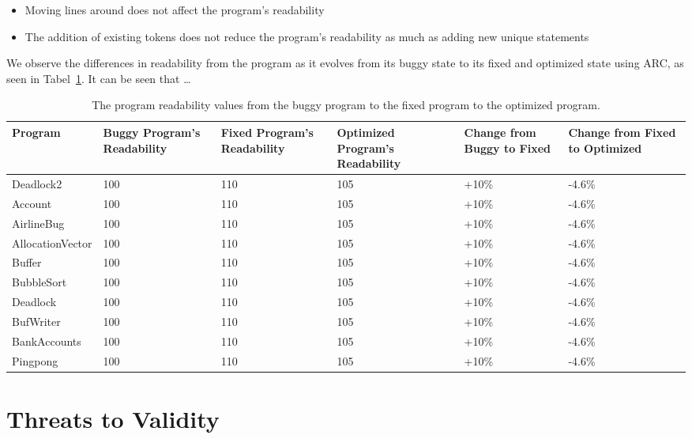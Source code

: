 \documentclass[10pt, conference, compsocconf]{IEEEtran}
\begin{document}
\begin{itemize}
  \item Moving lines around does not affect the program's readability
  \item The addition of existing tokens does not reduce the program's
readability as much as adding new unique statements
\end{itemize}

We observe the differences in readability from the program as it evolves from
its buggy state to its fixed and optimized state using ARC, as seen in
Tabel~\ref{tbl:readability}. It can be seen that \ldots %

\begin{table}[!t]
\begin{center}
\begin{tabular}{|l|p{2cm}|p{2cm}|p{2cm}|p{2cm}|p{2cm}|}
\hline
\textbf{Program} &
\textbf{Buggy Program's Readability} &
\textbf{Fixed Program's Readability} &
\textbf{Optimized Program's Readability} &
\textbf{Change from Buggy to Fixed} &
\textbf{Change from Fixed to Optimized}
\\\hline
Deadlock2 & 100 & 110 & 105 & +10\% & -4.6\%
\\\hline
Account & 100 & 110 & 105 & +10\% & -4.6\%
\\\hline
AirlineBug & 100 & 110 & 105 & +10\% & -4.6\%
\\\hline
AllocationVector & 100 & 110 & 105 & +10\% & -4.6\%
\\\hline
Buffer & 100 & 110 & 105 & +10\% & -4.6\%
\\\hline
BubbleSort & 100 & 110 & 105 & +10\% & -4.6\%
\\\hline
Deadlock & 100 & 110 & 105 & +10\% & -4.6\%
\\\hline
BufWriter & 100 & 110 & 105 & +10\% & -4.6\%
\\\hline
BankAccounts & 100 & 110 & 105 & +10\% & -4.6\%
\\\hline
Pingpong & 100 & 110 & 105 & +10\% & -4.6\%
\\\hline
\end{tabular}
\caption{The program readability values from the buggy program to the fixed program to the optimized program.}
\label{tbl:readability}
\end{center}
\end{table}

\section{Threats to Validity}
\label{sec:threats}
\end{document}
